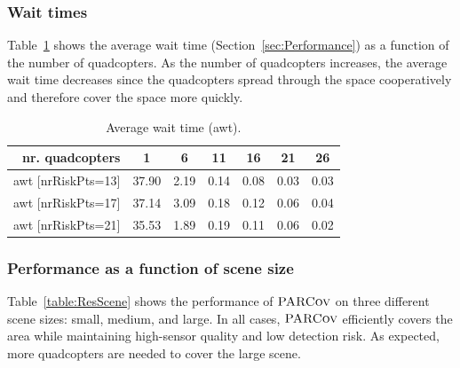 \documentclass[letterpaper, 10pt, conference]{ieeeconf}
\newcommand{\Function}[1]{\ensuremath{{ \textsc{#1}}}}
\newcommand{\Name}{\Function{\small{PARCov}}}
\begin{document}
\subsubsection{Wait times}
Table~\ref{table:ResWaitTimes} shows the average wait time
(Section~\ref{sec:Performance}) as a function of the number of quadcopters.
As the number
of quadcopters increases, the average wait time decreases since
the quadcopters spread through the space
cooperatively and therefore cover the space more quickly.


\begin{table}[h]
\begin{tabular}{r|cccccc}
nr. quadcopters & 1 & 6 & 11 & 16 & 21 & 26 \\\hline
awt [nrRiskPts=13] & 37.90 & 2.19 & 0.14 & 0.08 & 0.03 & 0.03 \\
awt [nrRiskPts=17] & 37.14 & 3.09 & 0.18 & 0.12 & 0.06 & 0.04 \\
awt [nrRiskPts=21] & 35.53 & 1.89 & 0.19 & 0.11 & 0.06 & 0.02
\end{tabular}

\caption{Average wait time (awt).}
\label{table:ResWaitTimes}
\end{table}


\subsubsection{Performance as a function of scene size}
Table~\ref{table:ResScene} shows the performance of $\Name$ on three
different scene sizes: small, medium, and large. In all cases, $\Name$
efficiently covers the area while maintaining high-sensor quality and low detection risk. As expected,
more quadcopters are needed to cover the large scene.
\end{document}
